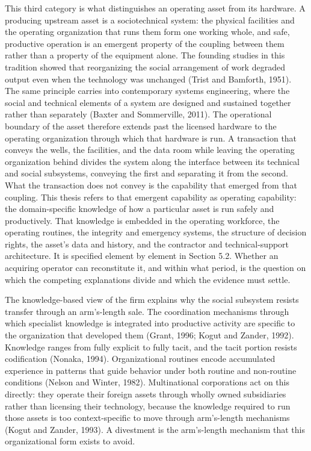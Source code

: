 This third category is what distinguishes an operating asset from its
hardware. A producing upstream asset is a sociotechnical system: the
physical facilities and the operating organization that runs them form
one working whole, and safe, productive operation is an emergent
property of the coupling between them rather than a property of the
equipment alone. The founding studies in this tradition showed that
reorganizing the social arrangement of work degraded output even when
the technology was unchanged (Trist and Bamforth, 1951). The same
principle carries into contemporary systems engineering, where the
social and technical elements of a system are designed and sustained
together rather than separately (Baxter and Sommerville, 2011). The
operational boundary of the asset therefore extends past the licensed
hardware to the operating organization through which that hardware is
run. A transaction that conveys the wells, the facilities, and the data
room while leaving the operating organization behind divides the system
along the interface between its technical and social subsystems,
conveying the first and separating it from the second. What the
transaction does not convey is the capability that emerged from that
coupling. This thesis refers to that emergent capability as operating
capability: the domain-specific knowledge of how a particular asset is
run safely and productively. That knowledge is embedded in the operating
workforce, the operating routines, the integrity and emergency systems,
the structure of decision rights, the asset's data and history, and the
contractor and technical-support architecture. It is specified element
by element in Section 5.2. Whether an acquiring operator can
reconstitute it, and within what period, is the question on which the
competing explanations divide and which the evidence must settle.

The knowledge-based view of the firm explains why the social subsystem
resists transfer through an arm's-length sale. The coordination
mechanisms through which specialist knowledge is integrated into
productive activity are specific to the organization that developed them
(Grant, 1996; Kogut and Zander, 1992). Knowledge ranges from fully
explicit to fully tacit, and the tacit portion resists codification
(Nonaka, 1994). Organizational routines encode accumulated experience in
patterns that guide behavior under both routine and non-routine
conditions (Nelson and Winter, 1982). Multinational corporations act on
this directly: they operate their foreign assets through wholly owned
subsidiaries rather than licensing their technology, because the
knowledge required to run those assets is too context-specific to move
through arm's-length mechanisms (Kogut and Zander, 1993). A divestment
is the arm's-length mechanism that this organizational form exists to
avoid.


